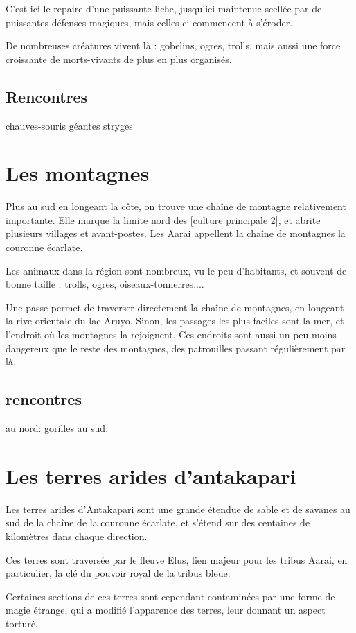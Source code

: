 \documentclass[10pt,a4paper]{book}
\begin{document}
C'est ici le repaire d'une puissante liche, jusqu'ici maintenue scellée par de puissantes défenses magiques, mais celles-ci commencent à s'éroder.

De nombreuses créatures vivent là : gobelins, ogres, trolls, mais aussi une force croissante de morts-vivants de plus en plus
 organisés.
 \subsection{Rencontres}
 chauves-souris géantes
 stryges
\section{Les montagnes}
Plus au sud en longeant la côte, on trouve une chaîne de montagne relativement importante. Elle marque la limite nord des [culture principale 2], et abrite plusieurs villages et avant-postes. Les Aarai appellent la chaîne de montagnes la couronne écarlate.

Les animaux dans la région sont nombreux, vu le peu d'habitants, et souvent de bonne taille : trolls, ogres, oiseaux-tonnerres....

Une passe permet de traverser directement la chaîne de montagnes, en longeant la rive orientale du lac Aruyo. Sinon, les passages les plus faciles sont la mer, et l'endroit où les montagnes la rejoignent. Ces endroits sont aussi un peu moins dangereux que le reste des montagnes, des patrouilles passant régulièrement par là.


\subsection{rencontres}
au nord: gorilles
au sud:

\section{Les terres arides d'antakapari}
Les terres arides d'Antakapari sont une grande étendue de sable et de savanes au sud de la chaîne de la couronne écarlate, et s'étend sur des centaines de kilomètres dans chaque direction. 

Ces terres sont traversée par le fleuve Elus, lien majeur pour les tribus Aarai, en particulier, la clé du pouvoir royal de la tribus bleue.

Certaines sections de ces terres sont cependant contaminées par une forme de magie étrange, qui a modifié l'apparence des terres, leur donnant un aspect torturé.
\end{document}
